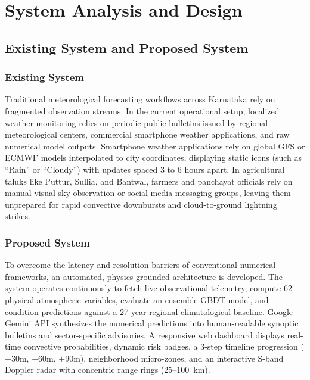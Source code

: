 \documentclass[12pt,a4paper]{report}
\begin{document}
\chapter{System Analysis and Design}
\thispagestyle{empty}

\section{Existing System and Proposed System}

\subsection{Existing System}
Traditional meteorological forecasting workflows across Karnataka rely on fragmented observation streams. In the current operational setup, localized weather monitoring relies on periodic public bulletins issued by regional meteorological centers, commercial smartphone weather applications, and raw numerical model outputs. Smartphone weather applications rely on global GFS or ECMWF models interpolated to city coordinates, displaying static icons (such as ``Rain'' or ``Cloudy'') with updates spaced 3 to 6 hours apart. In agricultural taluks like Puttur, Sullia, and Bantwal, farmers and panchayat officials rely on manual visual sky observation or social media messaging groups, leaving them unprepared for rapid convective downbursts and cloud-to-ground lightning strikes.

\subsection{Proposed System}
To overcome the latency and resolution barriers of conventional numerical frameworks, an automated, physics-grounded architecture is developed. The system operates continuously to fetch live observational telemetry, compute 62 physical atmospheric variables, evaluate an ensemble GBDT model, and condition predictions against a 27-year regional climatological baseline. Google Gemini API synthesizes the numerical predictions into human-readable synoptic bulletins and sector-specific advisories. A responsive web dashboard displays real-time convective probabilities, dynamic risk badges, a 3-step timeline progression ($+30$m, $+60$m, $+90$m), neighborhood micro-zones, and an interactive S-band Doppler radar with concentric range rings ($25$--$100$~km).
\end{document}
